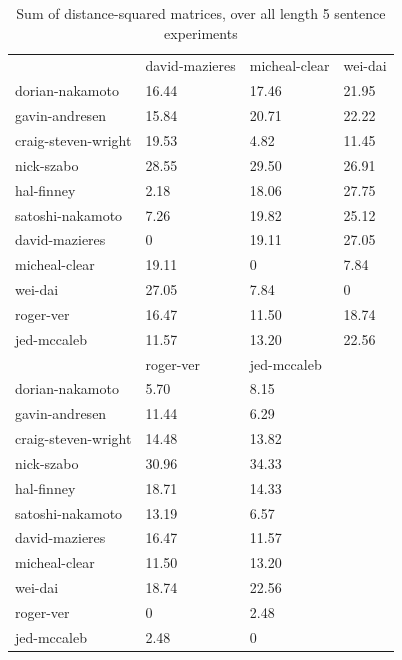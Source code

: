 \documentclass{article}%
\begin{document}
\begin{table}[]
\begin{tabular}{llll}
                    & david-mazieres  & micheal-clear  & wei-dai             \\
dorian-nakamoto     & 16.44    & 17.46    & 21.95         \\
gavin-andresen      & 15.84     & 20.71   & 22.22         \\
craig-steven-wright & 19.53   & 4.82     & 11.45         \\
nick-szabo          & 28.55     & 29.50     & 26.91         \\
hal-finney          & 2.18     & 18.06    & 27.75         \\
satoshi-nakamoto    & 7.26    & 19.82     & 25.12         \\
david-mazieres      & 0               & 19.11   & 27.05          \\
micheal-clear       & 19.11    & 0              & 7.84         \\
wei-dai             & 27.05      & 7.84   & 0                   \\
roger-ver           & 16.47     & 11.50    & 18.74         \\
jed-mccaleb         & 11.57     & 13.20    & 22.56       \\
                    & roger-ver       & jed-mccaleb    &                     \\
dorian-nakamoto     & 5.70     & 8.15    &                     \\
gavin-andresen      & 11.44    & 6.29    &                     \\
craig-steven-wright & 14.48    & 13.82    &                     \\
nick-szabo          & 30.96     & 34.33    &                     \\
hal-finney          & 18.71     & 14.33     &                     \\
satoshi-nakamoto    & 13.19     & 6.57    &                     \\
david-mazieres      & 16.47     & 11.57   &                     \\
micheal-clear       & 11.50     & 13.20    &                     \\
wei-dai             & 18.74     & 22.56   &                     \\
roger-ver           & 0               & 2.48    &                     \\
jed-mccaleb         & 2.48     & 0              &                    
\end{tabular}

\caption{Sum of distance-squared matrices, over all length 5 sentence experiments}
\end{table}
\end{document}
